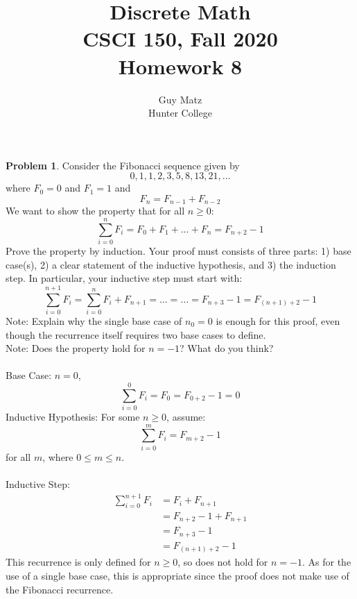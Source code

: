 \documentclass[10pt,leqno ]{article}
\title{Discrete Math\\
CSCI 150, Fall 2020\\
Homework 8}
\author{Guy Matz \\
Hunter College}
\theoremstyle{definition}
\newtheorem{problem}[theorem]{Problem}
\begin{document}
\begin{problem} Consider the Fibonacci sequence given by
$$0,1,1,2,3,5,8,13,21, \dots $$
where $F_0 = 0$ and $F_1= 1$ and
$$F_n = F_{n-1} + F_{n-2}$$
We want to show the property that for all $n \geq 0$:\\
$$\sum_{i=0}^{n} F_i = F_0 + F_1 + \dots + F_n = F_{n+2}-1$$
Prove  the  property  by  induction.   Your  proof  must  consists  of  three  parts:  1)  base case(s),  2)  a  clear  statement  of  the  inductive hypothesis,  and  3)  the induction step.  In particular, your inductive step must start with:
$$ \sum_{i=0}^{n+1} F_i = \sum_{i=0}^{n} F_i + F_{n+1} = \dots = \dots = F_{n+3} - 1 = F_{(n+1)+2}-1 $$
Note: Explain why the single base case of $n_0 = 0$ is enough for this proof, even though the recurrence itself requires two base cases to define.\\
Note:  Does the property hold for $n=-1$?  What do you think?
\\\\
\Large
Base Case: $n = 0$,
$$\sum_{i=0}^{0} F_i = F_0 = F_{0+2} -1 = 0$$
Inductive Hypothesis:  For some $n \geq 0$, assume:
$$\sum_{i=0}^{m} F_i = F_{m+2}-1$$
for all $m$, where $0 \leq m \leq n$.\\\\
Inductive Step:
\begin{align*}
\sum_{i=0}^{n+1} F_i &= F_{i} + F_{n+1}\\
                      &= F_{n+2} - 1 + F_{n+1}\\
                      &= F_{n+3} - 1 \\
                      &= F_{(n+1) + 2} - 1
\end{align*}
This recurrence is only defined for $n \geq 0$, so does not hold for $n = -1$.  As for the use of a single base case, this is appropriate since the proof does not make use of the Fibonacci recurrence.
\end{problem}
\newpage
\end{document}
